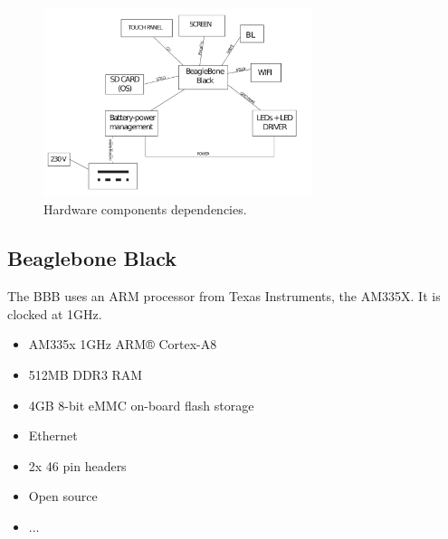 \begin{figure}[!htb]
    \centering
    \includegraphics[width=0.7\textwidth,keepaspectratio]{chap/hardFig/overall_hardware_dependecies}
    \caption{Hardware components dependencies.}
    \label{fig:hardware dependencies}
\end{figure}

\subsection{Beaglebone Black}
The BBB uses an ARM processor from Texas Instruments, the AM335X. It is clocked at 1GHz.
\begin{itemize}
  \item{ AM335x 1GHz ARM® Cortex-A8 }
  \item{512MB DDR3 RAM}
  \item{4GB 8-bit eMMC on-board flash storage}
  \item{Ethernet}
  \item{2x 46 pin headers}
  \item{Open source}
  \item{...}
\end{itemize}




